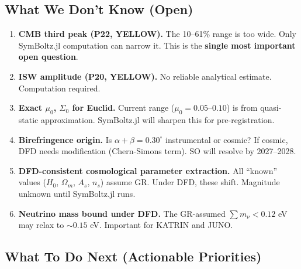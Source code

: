 \documentclass[11pt,a4paper]{article}
\begin{document}
\subsection{What We Don't Know (Open)}

\begin{enumerate}
\item \textbf{CMB third peak (P22, YELLOW).} The 10--61\% range is too wide. Only SymBoltz.jl computation can narrow it. This is the \textbf{single most important open question}.

\item \textbf{ISW amplitude (P20, YELLOW).} No reliable analytical estimate. Computation required.

\item \textbf{Exact $\mu_0$, $\Sigma_0$ for Euclid.} Current range ($\mu_0 = 0.05$--$0.10$) is from quasi-static approximation. SymBoltz.jl will sharpen this for pre-registration.

\item \textbf{Birefringence origin.} Is $\alpha + \beta = 0.30^\circ$ instrumental or cosmic? If cosmic, DFD needs modification (Chern-Simons term). SO will resolve by 2027--2028.

\item \textbf{DFD-consistent cosmological parameter extraction.} All ``known'' values ($H_0$, $\Omega_m$, $A_s$, $n_s$) assume GR. Under DFD, these shift. Magnitude unknown until SymBoltz.jl runs.

\item \textbf{Neutrino mass bound under DFD.} The GR-assumed $\sum m_\nu < 0.12$ eV may relax to $\sim 0.15$ eV. Important for KATRIN and JUNO.
\end{enumerate}

\subsection{What To Do Next (Actionable Priorities)}
\end{document}
